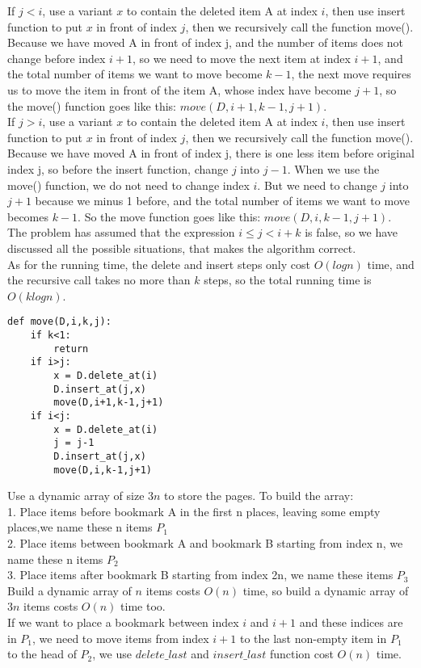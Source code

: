 \documentclass[12pt,twoside]{article}
\begin{document}
\begin{problems}
\begin{problemparts}
If $j<i$, use a variant $x$ to contain the deleted item A at index $i$, then use insert function to put $x$ in front of index $j$, then we recursively call the function move(). Because we have moved A in front of index j, and the number of items does not change before index $i+1$, so we need to move the next item at index $i+1$, and the total number of items we want to move become $k-1$, the next move requires us to move the item in front of the item A, whose index have become $j+1$, so the move() function goes like this: $move(D,i+1,k-1,j+1)$.\\
If $j>i$, use a variant $x$ to contain the deleted item A at index $i$, then use insert function to put $x$ in front of index $j$, then we recursively call the function move(). Because we have moved A in front of index j, there is one less item before original index j, so before the insert function, change $j$ into $j-1$. When we use the move() function, we do not need to change index $i$. But we need to change $j$ into $j+1$ because we minus 1 before, and the total number of items we want to move becomes $k-1$. So the move function goes like this: $move(D,i,k-1,j+1)$.\\
The problem has assumed that the expression $i\leq j<i+k$ is false, so we have discussed all the possible situations, that makes the algorithm correct.\\
As for the running time, the delete and insert steps only cost $O(logn)$ time, and the recursive call takes no more than $k$ steps, so the total running time is $O(klogn)$.\\
\begin{lstlisting}
def move(D,i,k,j):
    if k<1:
        return
    if i>j:
        x = D.delete_at(i)
        D.insert_at(j,x)
        move(D,i+1,k-1,j+1)
    if i<j:
        x = D.delete_at(i)
        j = j-1
        D.insert_at(j,x)
        move(D,i,k-1,j+1)
\end{lstlisting}
\end{problemparts}

\newpage
\problem  %
Use a dynamic array of size $3n$ to store the pages. To build the array:\\
1. Place items before bookmark A in the first n places, leaving some empty places,we name these n items $P_1$\\
2. Place items between bookmark A and bookmark B starting from index n, we name these n items $P_2$\\
3. Place items after bookmark B starting from index 2n, we name these items $P_3$\\
Build a dynamic array of $n$ items costs $O(n)$ time, so build a dynamic array of $3n$ items costs $O(n)$ time too.\\
If we want to place a bookmark between index $i$ and $i+1$ and these indices are in $P_1$, we need to move items from index $i+1$ to the last non-empty item in $P_1$ to the head of $P_2$, we use $delete\_last$ and $insert\_last$ function cost $O(n)$ time.


\end{problems}
\end{document}
